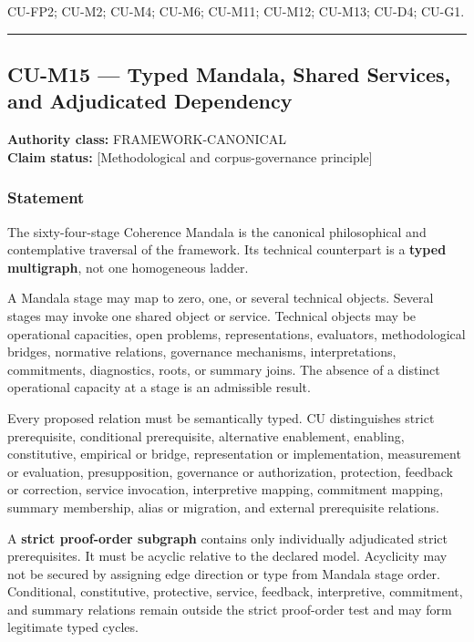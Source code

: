 \documentclass[
  11pt,
]{article}
\begin{document}
CU-FP2; CU-M2; CU-M4; CU-M6; CU-M11; CU-M12; CU-M13; CU-D4; CU-G1.

\begin{center}\rule{0.5\linewidth}{0.5pt}\end{center}

\subsection{CU-M15 --- Typed Mandala, Shared Services, and Adjudicated
Dependency}\label{cu-m15-typed-mandala-shared-services-and-adjudicated-dependency}

\textbf{Authority class:} FRAMEWORK-CANONICAL\\
\textbf{Claim status:} {[}Methodological and corpus-governance
principle{]}

\subsubsection{Statement}\label{statement-23}

The sixty-four-stage Coherence Mandala is the canonical philosophical
and contemplative traversal of the framework. Its technical counterpart
is a \textbf{typed multigraph}, not one homogeneous ladder.

A Mandala stage may map to zero, one, or several technical objects.
Several stages may invoke one shared object or service. Technical
objects may be operational capacities, open problems, representations,
evaluators, methodological bridges, normative relations, governance
mechanisms, interpretations, commitments, diagnostics, roots, or summary
joins. The absence of a distinct operational capacity at a stage is an
admissible result.

Every proposed relation must be semantically typed. CU distinguishes
strict prerequisite, conditional prerequisite, alternative enablement,
enabling, constitutive, empirical or bridge, representation or
implementation, measurement or evaluation, presupposition, governance or
authorization, protection, feedback or correction, service invocation,
interpretive mapping, commitment mapping, summary membership, alias or
migration, and external prerequisite relations.

A \textbf{strict proof-order subgraph} contains only individually
adjudicated strict prerequisites. It must be acyclic relative to the
declared model. Acyclicity may not be secured by assigning edge
direction or type from Mandala stage order. Conditional, constitutive,
protective, service, feedback, interpretive, commitment, and summary
relations remain outside the strict proof-order test and may form
legitimate typed cycles.
\end{document}
